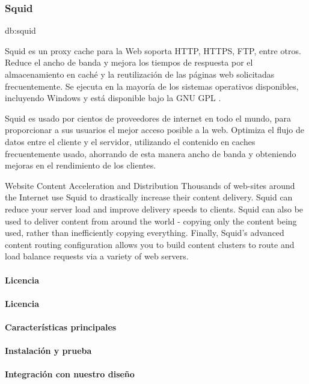 \subsubsection{Squid}
\label{soa:tecnologias:squid}

\gls{db:squid}

Squid es un proxy cache para la Web soporta HTTP, HTTPS, FTP, entre otros. Reduce el ancho de banda y mejora los tiempos de respuesta por el almacenamiento en caché y la reutilización de las páginas web solicitadas frecuentemente.  Se ejecuta en la mayoría de los sistemas operativos disponibles, incluyendo Windows y está disponible bajo la GNU GPL .

Squid es usado por cientos de proveedores de internet en todo el mundo, para proporcionar a sus usuarios el mejor acceso posible a la web.  Optimiza el flujo de datos entre el cliente y el servidor, utilizando el contenido en caches frecuentemente usado, ahorrando de esta manera ancho de banda y obteniendo mejoras en el rendimiento de los clientes.


Website Content Acceleration and Distribution
Thousands of web-sites around the Internet use Squid to drastically increase their content delivery. Squid can reduce your server load and improve delivery speeds to clients. Squid can also be used to deliver content from around the world - copying only the content being used, rather than inefficiently copying everything. Finally, Squid's advanced content routing configuration allows you to build content clusters to route and load balance requests via a variety of web servers.


\paragraph{Licencia}

\paragraph{Licencia}

\paragraph{Características principales}

\paragraph{Instalación y prueba}

\paragraph{Integración con nuestro diseño}
